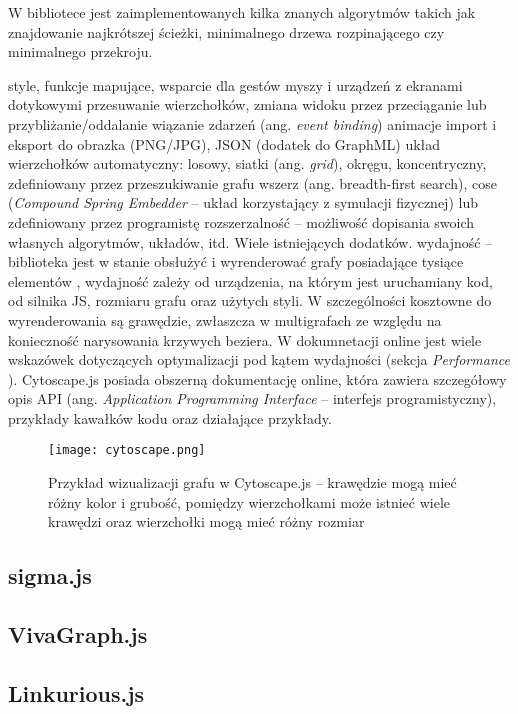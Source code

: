 W bibliotece jest zaimplementowanych kilka znanych algorytmów takich jak znajdowanie najkrótszej ścieżki, minimalnego drzewa rozpinającego czy minimalnego przekroju. 

style, funkcje mapujące, 
wsparcie dla gestów myszy i urządzeń z ekranami dotykowymi
przesuwanie wierzchołków, zmiana widoku przez przeciąganie lub przybliżanie/oddalanie
wiązanie zdarzeń (ang. \textit{event binding})  
animacje
import i eksport do obrazka (PNG/JPG), JSON (dodatek do GraphML)
układ wierzchołków automatyczny: losowy, siatki (ang. \textit{grid}), okręgu, koncentryczny, zdefiniowany przez przeszukiwanie grafu wszerz (ang. breadth-first search), cose (\textit{Compound Spring Embedder} -- układ korzystający z symulacji fizycznej) lub zdefiniowany przez programistę
rozszerzalność -- możliwość dopisania swoich własnych algorytmów, układów, itd. Wiele istniejących dodatków. 
wydajność -- biblioteka jest w stanie obsłużyć i wyrenderować grafy posiadające tysiące elementów \cite[310]{franz}, wydajność zależy od urządzenia, na którym jest uruchamiany kod, od silnika JS, rozmiaru grafu oraz użytych styli. W szczególności kosztowne do wyrenderowania są grawędzie, zwłaszcza w multigrafach ze względu na konieczność narysowania krzywych beziera. W dokumnetacji online jest wiele wskazówek dotyczących optymalizacji pod kątem wydajności (sekcja \textit{Performance} \cite{cytoscape}).
Cytoscape.js posiada obszerną dokumentację online, która zawiera szczegółowy opis API (ang. \textit{Application Programming Interface} -- interfejs programistyczny), przykłady kawałków kodu oraz działające przykłady. 


\begin{figure}[H]
\centering
\texttt{[image: cytoscape.png]}
\caption{Przykład wizualizacji grafu w Cytoscape.js -- krawędzie mogą mieć różny kolor i grubość, pomiędzy wierzchołkami może istnieć wiele krawędzi oraz wierzchołki mogą mieć różny rozmiar}\label{fig:cytoscape}
\end{figure}

\subsection{sigma.js}
\subsection{VivaGraph.js}
\subsection{Linkurious.js}

